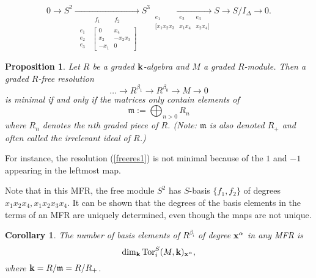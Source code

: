 \documentclass{amsart}
\newtheorem{prop}[defn]{Proposition}
\newtheorem{cor}[defn]{Corollary}
\newcommand{\Tor}{\mathop{\rm Tor}\nolimits}
\newcommand{\fld}{{\bf k}}
\newcommand{\mm}{{\mathfrak m}}
\newcommand{\xx}{{\bf x}}
\newcommand{\defterm}[1] {{\it #1\/}}
\begin{document}
	\begin{equation} \label{freeres2}
	0 \to S^2 \xrightarrow[
		\begin{array}{cc} & \begin{matrix} f_1 &&& f_2 \end{matrix} \\
			\begin{matrix} e_1 \\ e_2 \\ e_3 \end{matrix} &
			\begin{bmatrix} 0 & x_4 \\ x_2 & -x_2x_3 \\ -x_1 & 0 \end{bmatrix}
		\end{array}
	]{} S^3 \xrightarrow[
		\begin{array}{ccc}
			    e_1       & e_2    & e_3    \\
			{[} x_1x_2x_3 & x_1x_4 & x_2x_4 {]} \\
		\end{array}
	]{} S \to S/I_\Delta \to 0.
	\end{equation}

\begin{prop} Let $R$ be a graded $\fld$-algebra and $M$ a graded $R$-module.  Then a graded 
$R$-free resolution
	$$\dots \to R^{\beta_1} \to R^{\beta_0} \to M \to 0$$
is minimal if and only if the matrices only contain elements of
	$$\mm := \bigoplus_{n>0} R_n$$
where $R_n$ denotes the $n$th graded piece of $R$.  (Note: $\mm$ is also denoted $R_+$ and 
often called the \defterm{irrelevant ideal} of $R$.)
\end{prop}

For instance, the resolution (\ref{freeres1}) is not minimal because of the $1$ and $-1$ 
appearing in the leftmost map.

Note that in this MFR, the free module $S^2$ has $S$-basis $\{f_1,f_2\}$ of
degrees $x_1 x_2 x_4, x_1 x_2 x_3 x_4$.  It can be shown that the degrees of
the basis elements in the terms of an MFR are uniquely determined, even though
the maps are not unique.

\begin{cor} The number of basis elements of $R^{\beta_i}$ of degree $\xx^\alpha$ in any MFR is
	$$\dim_\fld \Tor^S_i(M,\fld)_{\xx^\alpha},$$
where $\fld = R/\mm = R/R_+$.
\end{cor}
\end{document}
